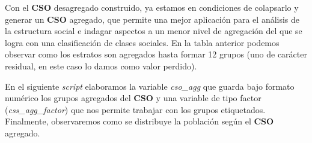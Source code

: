 \documentclass[
]{book}
\begin{document}
Con el \textbf{CSO} desagregado construido, ya estamos en condiciones de colapsarlo y generar un \textbf{CSO} agregado, que permite una mejor aplicación para el análisis de la estructura social e indagar aspectos a un menor nivel de agregación del que se logra con una clasificación de clases sociales. En la tabla anterior podemos observar como los estratos son agregados hasta formar 12 grupos (uno de carácter residual, en este caso lo damos como valor perdido).

En el siguiente \emph{script} elaboramos la variable \emph{cso\_agg} que guarda bajo formato numérico los grupos agregados del \textbf{CSO} y una variable de tipo factor (\emph{css\_agg\_factor}) que nos permite trabajar con los grupos etiquetados. Finalmente, observaremos como se distribuye la población según el \textbf{CSO} agregado.
\end{document}
